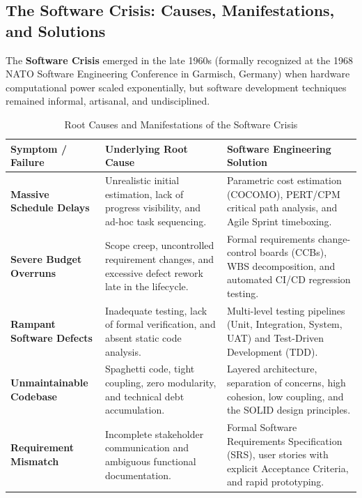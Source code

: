 \subsection{The Software Crisis: Causes, Manifestations, and Solutions}
The \textbf{Software Crisis} emerged in the late 1960s (formally recognized at the 1968 NATO Software Engineering Conference in Garmisch, Germany) when hardware computational power scaled exponentially, but software development techniques remained informal, artisanal, and undisciplined.
\begin{table}[htbp]
\centering
\small
\caption{Root Causes and Manifestations of the Software Crisis}
\label{tab:software_crisis}
\begin{tabularx}{\textwidth}{p{3.8cm} p{5.5cm} X}
\toprule
\textbf{Symptom / Failure} & \textbf{Underlying Root Cause} & \textbf{Software Engineering Solution} \\
\midrule
\textbf{Massive Schedule Delays} & Unrealistic initial estimation, lack of progress visibility, and ad-hoc task sequencing. & Parametric cost estimation (COCOMO), PERT/CPM critical path analysis, and Agile Sprint timeboxing. \\
\textbf{Severe Budget Overruns} & Scope creep, uncontrolled requirement changes, and excessive defect rework late in the lifecycle. & Formal requirements change-control boards (CCBs), WBS decomposition, and automated CI/CD regression testing. \\
\textbf{Rampant Software Defects} & Inadequate testing, lack of formal verification, and absent static code analysis. & Multi-level testing pipelines (Unit, Integration, System, UAT) and Test-Driven Development (TDD). \\
\textbf{Unmaintainable Codebase} & Spaghetti code, tight coupling, zero modularity, and technical debt accumulation. & Layered architecture, separation of concerns, high cohesion, low coupling, and the SOLID design principles. \\
\textbf{Requirement Mismatch} & Incomplete stakeholder communication and ambiguous functional documentation. & Formal Software Requirements Specification (SRS), user stories with explicit Acceptance Criteria, and rapid prototyping. \\
\bottomrule
\end{tabularx}
\end{table}

